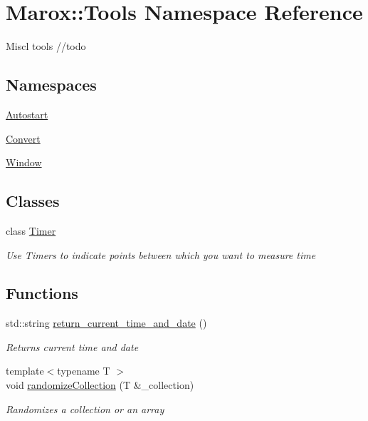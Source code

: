 \hypertarget{namespace_marox_1_1_tools}{}\section{Marox\+:\+:Tools Namespace Reference}
\label{namespace_marox_1_1_tools}


Miscl tools //todo  


\subsection*{Namespaces}
\begin{DoxyCompactItemize}
\item 
 \hyperlink{namespace_marox_1_1_tools_1_1_autostart}{Autostart}
\item 
 \hyperlink{namespace_marox_1_1_tools_1_1_convert}{Convert}
\item 
 \hyperlink{namespace_marox_1_1_tools_1_1_window}{Window}
\end{DoxyCompactItemize}
\subsection*{Classes}
\begin{DoxyCompactItemize}
\item 
class \hyperlink{class_marox_1_1_tools_1_1_timer}{Timer}
\begin{DoxyCompactList}\small\item\em Use Timers to indicate \textquotesingle{}points\textquotesingle{} between which you want to measure time \end{DoxyCompactList}\end{DoxyCompactItemize}
\subsection*{Functions}
\begin{DoxyCompactItemize}
\item 
std\+::string \hyperlink{namespace_marox_1_1_tools_a0e8087f6f22440b0bbe44cfd1f10b728}{return\+\_\+current\+\_\+time\+\_\+and\+\_\+date} ()
\begin{DoxyCompactList}\small\item\em Returns current time and date \end{DoxyCompactList}\item 
{\footnotesize template$<$typename T $>$ }\\void \hyperlink{namespace_marox_1_1_tools_a3e8bf1b551b6c5ed30fdc594e6e745a6}{randomize\+Collection} (T \&\+\_\+collection)
\begin{DoxyCompactList}\small\item\em Randomizes a collection or an array \end{DoxyCompactList}\end{DoxyCompactItemize}


